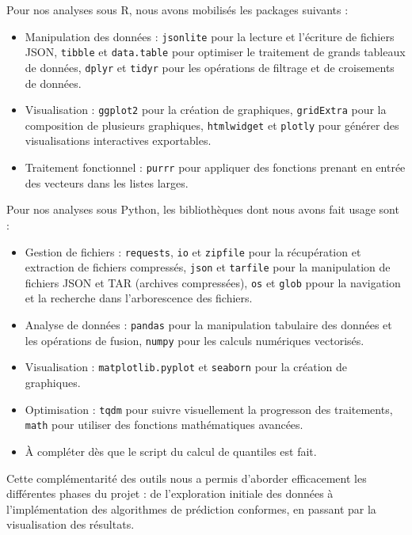 \documentclass[a4paper,12pt]{article}
\begin{document}
\vspace{0.2cm}

Pour nos analyses sous R, nous avons mobilisés les packages suivants :
\begin{itemize}
    \item Manipulation des données : \texttt{jsonlite} pour la lecture et l'écriture de fichiers JSON, \texttt{tibble} et \texttt{data.table} pour optimiser le traitement de grands tableaux de données, \texttt{dplyr} et \texttt{tidyr} pour les opérations de filtrage et de croisements de données.
    \item Visualisation : \texttt{ggplot2} pour la création de graphiques, \texttt{gridExtra} pour la composition de plusieurs graphiques, \texttt{htmlwidget} et \texttt{plotly} pour générer des visualisations interactives exportables.
    \item Traitement fonctionnel : \texttt{purrr} pour appliquer des fonctions prenant en entrée des vecteurs dans les listes larges.
\end{itemize}

\vspace{0.2cm}

Pour nos analyses sous Python, les bibliothèques dont nous avons fait usage sont :
\begin{itemize}
    \item Gestion de fichiers : \texttt{requests}, \texttt{io}  et \texttt{zipfile} pour la récupération et extraction de fichiers compressés, \texttt{json} et \texttt{tarfile} pour la manipulation de fichiers JSON et TAR (archives compressées), \texttt{os} et \texttt{glob} ppour la navigation et la recherche dans l'arborescence des fichiers.
    \item Analyse de données : \texttt{pandas} pour la manipulation tabulaire des données et les opérations de fusion, \texttt{numpy} pour les calculs numériques vectorisés.
    \item Visualisation : \texttt{matplotlib.pyplot} et \texttt{seaborn} pour la création de graphiques.
    \item Optimisation : \texttt{tqdm} pour suivre visuellement la progresson des traitements, \texttt{math} pour utiliser des fonctions mathématiques avancées.
    \item À compléter dès que le script du calcul de quantiles est fait. 
\end{itemize}

\vspace{0.2cm}

Cette complémentarité des outils nous a permis d'aborder efficacement les différentes phases du projet : de l'exploration initiale des données à l'implémentation des algorithmes de prédiction conformes, en passant par la visualisation des résultats.
\end{document}
